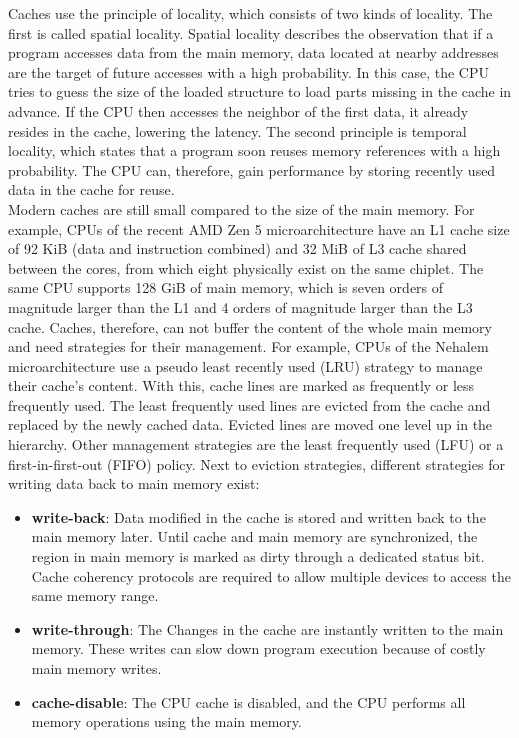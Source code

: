 Caches use the principle of locality, which consists of two kinds of locality.
The first is called spatial locality. Spatial locality describes the observation
that if a program accesses data from the main memory, data located at nearby
addresses are the target of future accesses with a high probability. In this
case, the CPU tries to guess the size of the loaded structure to load parts
missing in the cache in advance. If the CPU then accesses the neighbor of the
first data, it already resides in the cache, lowering the latency. The second
principle is temporal locality, which states that a program soon reuses memory
references with a high probability. The CPU can, therefore, gain performance by
storing recently used data in the cache for reuse.\\

Modern caches are still small compared to the size of the main memory. For
example, CPUs of the recent AMD Zen 5 microarchitecture have an L1 cache size of
92 KiB (data and instruction combined) and 32 MiB of L3 cache shared between the
cores, from which eight physically exist on the same chiplet. The same CPU
supports 128 GiB of main memory, which is seven orders of magnitude larger than
the L1 and 4 orders of magnitude larger than the L3 cache. Caches, therefore,
can not buffer the content of the whole main memory and need strategies for
their management. For example, CPUs of the Nehalem microarchitecture use a
pseudo least recently used (LRU) strategy to manage their cache's
content.\cite{hennessy2011computer} With this, cache lines are marked as
frequently or less frequently used. The least frequently used lines are evicted
from the cache and replaced by the newly cached data. Evicted lines are moved
one level up in the hierarchy. Other management strategies are the least
frequently used (LFU) or a first-in-first-out (FIFO) policy. Next to eviction
strategies, different strategies for writing data back to main memory exist:
\begin{itemize}
    \item \textbf{write-back}: Data modified in the cache is stored and written
          back to the main memory later. Until cache and main memory are
          synchronized, the region in main memory is marked as dirty through a
          dedicated status bit. Cache coherency protocols are required to allow
          multiple devices to access the same memory range.
    \item \textbf{write-through}: The Changes in the cache are instantly written
          to the main memory. These writes can slow down program execution
          because of costly main memory writes.
    \item \textbf{cache-disable}: The CPU cache is disabled, and the CPU
          performs all memory operations using the main memory.
\end{itemize}
